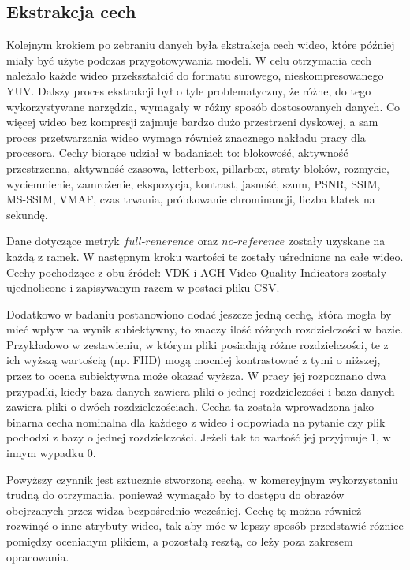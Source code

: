 \subsection{Ekstrakcja cech}
Kolejnym krokiem po zebraniu danych była ekstrakcja cech wideo, które później miały być użyte podczas przygotowywania modeli. W celu otrzymania cech należało każde wideo przekształcić do formatu surowego, nieskompresowanego YUV. Dalszy proces ekstrakcji był o tyle problematyczny, że różne, do tego wykorzystywane narzędzia, wymagały w różny sposób dostosowanych danych. Co więcej wideo bez kompresji zajmuje bardzo dużo przestrzeni dyskowej, a sam proces przetwarzania wideo wymaga również znacznego nakładu pracy dla procesora. Cechy biorące udział w badaniach to: blokowość, aktywność przestrzenna, aktywność czasowa, letterbox, pillarbox, straty bloków, rozmycie, wyciemnienie, zamrożenie, ekspozycja, kontrast, jasność, szum, PSNR, SSIM, MS-SSIM, VMAF, czas trwania, próbkowanie chrominancji, liczba klatek na sekundę.\par

Dane dotyczące metryk $full$-$renerence$ oraz $no$-$reference$ zostały uzyskane na każdą z ramek. W następnym kroku wartości te zostały uśrednione na całe wideo. Cechy pochodzące z obu źródeł: VDK i AGH Video Quality Indicators zostały ujednolicone i zapisywanym razem w postaci pliku CSV.\par

Dodatkowo w badaniu postanowiono dodać jeszcze jedną cechę, która mogła by mieć wpływ na wynik subiektywny, to znaczy ilość różnych rozdzielczości w bazie. Przykładowo w zestawieniu, w którym pliki posiadają różne rozdzielczości, te z ich wyższą wartością (np. FHD) mogą mocniej kontrastować z tymi o niższej, przez to ocena subiektywna może okazać wyższa. W pracy jej rozpoznano dwa przypadki, kiedy baza danych zawiera pliki o jednej rozdzielczości i baza danych zawiera pliki o dwóch rozdzielczościach. Cecha ta została wprowadzona jako binarna cecha nominalna dla każdego z wideo i odpowiada na pytanie czy plik pochodzi z bazy o jednej rozdzielczości. Jeżeli tak to wartość jej przyjmuje 1, w innym wypadku 0.  \par

Powyższy czynnik jest sztucznie stworzoną cechą, w komercyjnym wykorzystaniu trudną do otrzymania, ponieważ wymagało by to dostępu do obrazów obejrzanych przez widza bezpośrednio wcześniej. Cechę tę można również rozwinąć o inne atrybuty wideo, tak aby móc w lepszy sposób przedstawić różnice pomiędzy ocenianym plikiem, a pozostałą resztą, co leży poza zakresem opracowania.\par

